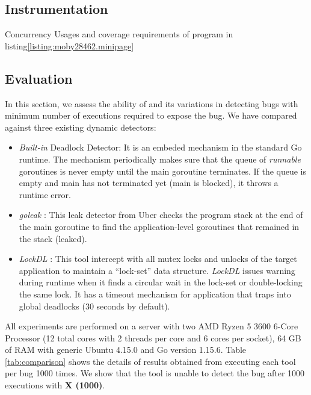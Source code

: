 \subsection{Instrumentation}
\label{sec:dl_instrument}



\begin{table}[]
\centering
\caption{Concurrency Usages and coverage requirements of program in listing\ref{listing:moby28462.minipage}}
\scalebox{0.9}{

}
\label{tab:moby_cov_table}
\end{table}


\subsection{Evaluation}
\label{sec:dl_evaluation}
In this section, we assess the ability of \goat and its variations in detecting bugs with minimum number of executions required to expose the bug.
%
We have compared \goat against three existing dynamic detectors:
\begin{itemize}
  \item \textit{Built-in} Deadlock Detector: It is an embeded mechanism in the standard Go runtime. The mechanism periodically makes sure that the queue of \textit{runnable} goroutines is never empty until the main goroutine terminates. If the queue is empty and main has not terminated yet (\ie main is blocked), it throws a runtime error.
  \item \textit{goleak} \cite{goleak}: This leak detector from Uber checks the program stack at the end of the main goroutine to find the application-level goroutines that remained in the stack (\ie leaked).
  \item \textit{LockDL} \cite{lockdl}: This tool intercept with all mutex locks and unlocks of the target application to maintain a ``lock-set'' data structure. \textit{LockDL} issues warning during runtime when it finds a circular wait in the lock-set or double-locking the same lock. It has a timeout mechanism for application that traps into global deadlocks (30 seconds by default).
\end{itemize}

All experiments are performed on a server with two AMD Ryzen 5 3600 6-Core Processor (12 total cores with 2 threads per core and 6 cores per socket), 64 GB of RAM with generic Ubuntu 4.15.0 and Go version 1.15.6.
%
Table \ref{tab:comparison} shows the details of results obtained from executing each tool per bug 1000 times.
%
We show that the tool is unable to detect the bug after 1000 executions with \textbf{X (1000)}.
%

